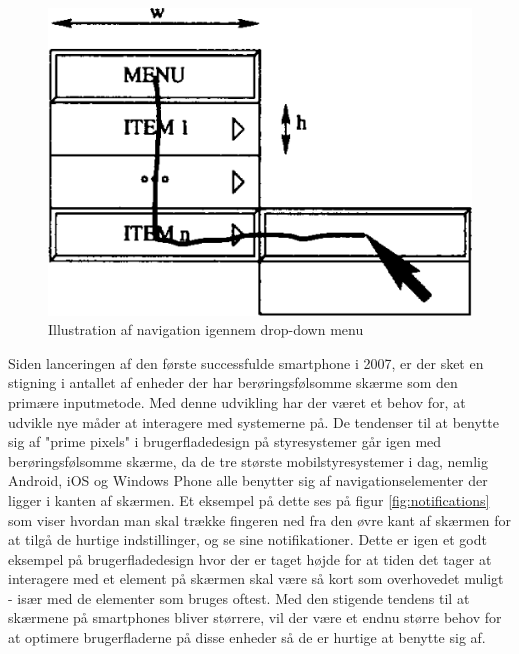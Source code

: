 \begin{figure}
	\centering
	\includegraphics[width=\linewidth]{images/illustrations/dropdown}
	\caption{Illustration af navigation igennem drop-down menu}
	\label{fig:dropdown}
\end{figure}

Siden lanceringen af den første successfulde smartphone i 2007, er der sket en stigning i antallet af enheder der har berøringsfølsomme skærme som den primære inputmetode. Med denne udvikling har der været et behov for, at udvikle nye måder at interagere med systemerne på. De tendenser til at benytte sig af "prime pixels" i brugerfladedesign på styresystemer går igen med berøringsfølsomme skærme, da de tre største mobilstyresystemer i dag, nemlig Android, iOS og Windows Phone alle benytter sig af navigationselementer der ligger i kanten af skærmen. Et eksempel på dette ses på figur \ref{fig:notifications} som viser hvordan man skal trække fingeren ned fra den øvre kant af skærmen for at tilgå de hurtige indstillinger, og se sine notifikationer. Dette er igen et godt eksempel på brugerfladedesign hvor der er taget højde for at tiden det tager at interagere med et element på skærmen skal være så kort som overhovedet muligt - især med de elementer som bruges oftest. Med den stigende tendens til at skærmene på smartphones bliver størrere, vil der være et endnu større behov for at optimere brugerfladerne på disse enheder så de er hurtige at benytte sig af.\\

